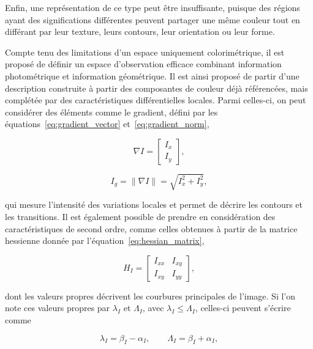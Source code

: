 Enfin, une représentation de ce type peut être insuffisante, puisque des régions ayant des significations différentes peuvent partager une même couleur tout en différant par leur texture, leurs contours, leur orientation ou leur forme.

Compte tenu des limitations d’un espace uniquement colorimétrique, il est proposé de définir un espace d’observation efficace combinant information photométrique et information géométrique. Il est ainsi proposé de partir d’une description construite à partir des composantes de couleur déjà référencées, mais complétée par des caractéristiques différentielles locales. Parmi celles-ci, on peut considérer des éléments comme le gradient, défini par les équations~\eqref{eq:gradient_vector} et~\eqref{eq:gradient_norm},

\begin{equation}
\nabla I=
\begin{bmatrix}
I_x\\
I_y
\end{bmatrix},
\label{eq:gradient_vector}
\end{equation}

\begin{equation}
I_g=\|\nabla I\|=\sqrt{I_x^2+I_y^2},
\label{eq:gradient_norm}
\end{equation}

qui mesure l’intensité des variations locales et permet de décrire les contours et les transitions. Il est également possible de prendre en considération des caractéristiques de second ordre, comme celles obtenues à partir de la matrice hessienne donnée par l’équation~\eqref{eq:hessian_matrix},

\begin{equation}
H_I=
\begin{bmatrix}
I_{xx} & I_{xy}\\
I_{xy} & I_{yy}
\end{bmatrix},
\label{eq:hessian_matrix}
\end{equation}

dont les valeurs propres décrivent les courbures principales de l’image. Si l’on note ces valeurs propres par \(\lambda_I\) et \(\Lambda_I\), avec \(\lambda_I\leq \Lambda_I\), celles-ci peuvent s’écrire comme

\begin{equation}
\lambda_I=\beta_I-\alpha_I,
\qquad
\Lambda_I=\beta_I+\alpha_I,
\label{eq:eigenvalues_hessian}
\end{equation}

